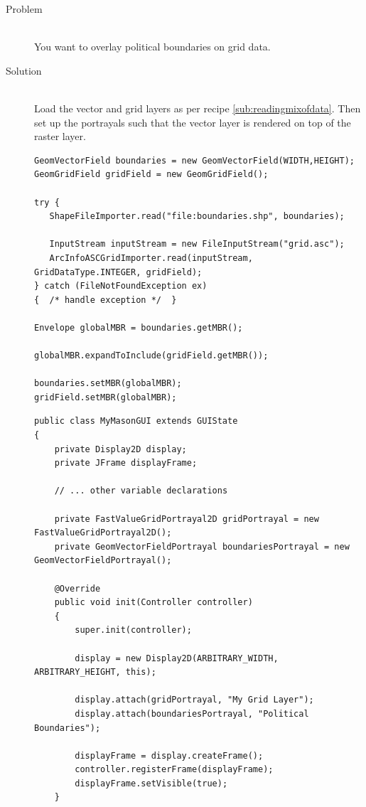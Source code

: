 \documentclass[twoside,10pt]{book}
\begin{document}
\begin{description}
\item[Problem]~\\
You want to overlay political boundaries on grid data.

\item[Solution]~\\
Load the vector and grid layers as per recipe
\ref{sub:readingmixofdata}.  Then set up the portrayals such that the
vector layer is rendered on top of the raster layer.

\begin{Verbatim}[frame=lines,label=Reading the layers,framesep=5mm,commandchars=+\[\]]
GeomVectorField boundaries = new GeomVectorField(WIDTH,HEIGHT);
GeomGridField gridField = new GeomGridField();

try {
   ShapeFileImporter.read("file:boundaries.shp", boundaries);

   InputStream inputStream = new FileInputStream("grid.asc");
   ArcInfoASCGridImporter.read(inputStream, GridDataType.INTEGER, gridField);
} catch (FileNotFoundException ex)
{  /* handle exception */  }

Envelope globalMBR = boundaries.getMBR();

globalMBR.expandToInclude(gridField.getMBR());

boundaries.setMBR(globalMBR);
gridField.setMBR(globalMBR);
\end{Verbatim}

\begin{Verbatim}[frame=lines,label=Displaying boundaries over the grid,framesep=5mm,commandchars=+\[\]]
public class MyMasonGUI extends GUIState
{
    private Display2D display;
    private JFrame displayFrame;

    // ... other variable declarations

    private FastValueGridPortrayal2D gridPortrayal = new FastValueGridPortrayal2D();
    private GeomVectorFieldPortrayal boundariesPortrayal = new GeomVectorFieldPortrayal();

    @Override
    public void init(Controller controller)
    {
        super.init(controller);

        display = new Display2D(ARBITRARY_WIDTH, ARBITRARY_HEIGHT, this);

        display.attach(gridPortrayal, "My Grid Layer");
        display.attach(boundariesPortrayal, "Political Boundaries");

        displayFrame = display.createFrame();
        controller.registerFrame(displayFrame);
        displayFrame.setVisible(true);
    }


\end{Verbatim}
\end{description}
\end{document}
